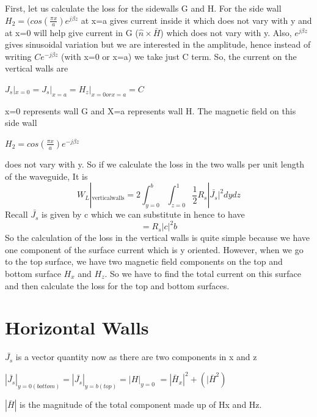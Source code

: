 First, let us calculate the loss for the sidewalls G and H. 
For the side wall $H_2=(cos(\frac{\pi x}{a})e^{j\beta z}$ at x=a gives current inside it which does not vary with y and at x=0 will help give current in G ($\hat{n} \times \bar{H}$) which does not vary with y. Also, $e^{j\beta z}$ gives sinusoidal variation but we are interested in the amplitude, hence instead of writing $Ce^{-j\beta z}$ (with x=0 or x=a) we take just C term. So, the current on the vertical walls are
\begin{center}
$J_s|_{x=0} = J_s|_{x=a} = H_z|_{x=0 or x=a} = C$	
\end{center}
x=0 represents wall G and X=a represents wall H. The magnetic field on this side wall
\begin{center}
$H_2=cos(\frac{\pi x}{a}) e^{-j\beta z}$	
\end{center}
does not vary with y. So if we calculate the loss in the two walls per unit length of the waveguide, It is
\begin{equation}
W_L|_{\text{verticalwalls}} = 2\int_{y=0}^{b}\int_{z=0}^{1}\frac{1}{2}R_s|\bar{J_s}|^2dydz
\end{equation}
Recall $\bar{J_s}$ is given by c which we can substitute in hence to have
\begin{equation}
=R_s|c|^2b
\end{equation}
So the calculation of the loss in the vertical walls is quite simple because we have one component of the surface current which is y oriented. 
However, when we go to the top surface, we have two magnetic field components on the top and bottom surface $H_x$ and $H_z$. So we have to find the total current on this surface and then calculate the loss for the top and bottom surfaces. 

\section{Horizontal Walls} 
$\bar{J_s}$ is a vector quantity now as there are two components in x and z
\begin{center}
$|\bar{J_s}|_{y=0(bottom)} = |\bar{J_s}|_{y=b(top)} = |H|_{y=0}$
$=|\bar{H}_x|^2 + (|\bar{H}^2 )$
\end{center}
$|\bar{H}|$ is the magnitude of the total component made up of Hx and Hz.

